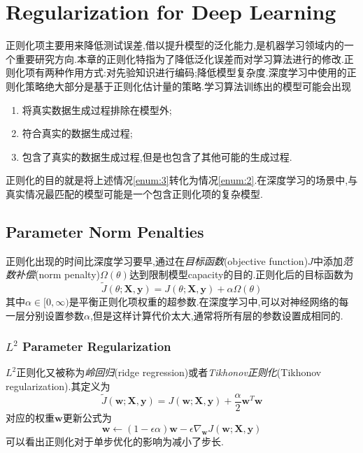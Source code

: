 \chapter{Regularization for Deep Learning}

正则化项主要用来降低测试误差,借以提升模型的泛化能力,是机器学习领域内的一个重要研究方向.本章的正则化特指为了降低泛化误差而对学习算法进行的修改.正则化项有两种作用方式:对先验知识进行编码;降低模型复杂度.深度学习中使用的正则化策略绝大部分是基于正则化估计量的策略.学习算法训练出的模型可能会出现
\begin{enumerate}
    \item 将真实数据生成过程排除在模型外;
    \item 符合真实的数据生成过程;\label{enum:2}
    \item 包含了真实的数据生成过程,但是也包含了其他可能的生成过程.\label{enum:3}
\end{enumerate}
正则化的目的就是将上述情况\ref{enum:3}转化为情况\ref{enum:2}.在深度学习的场景中,与真实情况最匹配的模型可能是一个包含正则化项的复杂模型.

\section{Parameter Norm Penalties}

正则化出现的时间比深度学习要早,通过在\textit{目标函数}(objective function)$J$中添加\textit{范数补偿}(norm penalty)$\Omega(\theta)$达到限制模型capacity的目的.正则化后的目标函数为
\begin{equation}\label{eq:cost_func}
\tilde J(\theta;\mathbf{X,y})=J(\theta;\mathbf{X,y})+\alpha\Omega(\theta)
\end{equation}
其中$\alpha\in[0,\infty)$是平衡正则化项权重的超参数.在深度学习中,可以对神经网络的每一层分别设置参数$\alpha$,但是这样计算代价太大,通常将所有层的参数设置成相同的.

\subsection{$L^2$ Parameter Regularization}

$L^2$正则化又被称为\textit{岭回归}(ridge regression)或者\textit{Tikhonov正则化}(Tikhonov regularization).其定义为
\begin{equation}
\tilde J(\mathbf w;\mathbf{X,y})=J(\mathbf w;\mathbf{X,y})+\frac{\alpha}{2}\mathbf w^T\mathbf w
\end{equation}
对应的权重$\mathbf w$更新公式为
\begin{equation}
\mathbf w\leftarrow(1-\epsilon\alpha)\mathbf w-\epsilon\nabla_{\mathbf w}J(\mathbf {w;X,y})
\end{equation}
可以看出正则化对于单步优化的影响为减小了步长.

